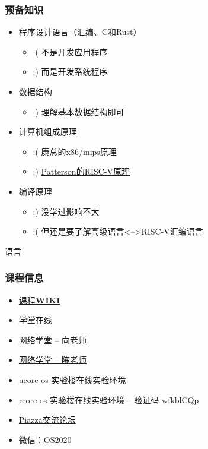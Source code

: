 \begin{frame}

\frametitle{预备知识}

\begin{itemize}

\item 程序设计语言（汇编、C和Rust）
  \begin{itemize}
    \item :( 不是开发应用程序
    \item :) 而是开发系统程序
  \end{itemize}
\item 数据结构
  \begin{itemize}
    \item :) 理解基本数据结构即可 
  \end{itemize}
\item 计算机组成原理
  \begin{itemize}
    \item :( 康总的x86/mips原理 
    \item  :)  \href{http://crva.ict.ac.cn/documents/RISC-V-Reader-Chinese-v2p1.pdf}{Patterson的RISC-V原理}
  \end{itemize}
\item 编译原理
  \begin{itemize}
    \item :) 没学过影响不大  
    \item :( 但还是要了解高级语言<-->RISC-V汇编语言

  \end{itemize}

\end{itemize}

\end{frame}

\begin{frame}语言
	\frametitle{课程信息}
	\begin{itemize}
		\item \href{http://os.cs.tsinghua.edu.cn/oscourse/OS2018spring}{课程\textbf{WIKI}}
		\item \href{http://www.xuetangx.com/courses/course-v1:TsinghuaX+30240243X_2015_T2+2015_T2/about}{学堂在线}
		\item \href{http://learn.tsinghua.edu.cn/f/wlxt/index/course/teacher/course?wlkcid=2019-2020-2140259621}{网络学堂 -- 向老师}		
		\item \href{http://learn.tsinghua.edu.cn/f/wlxt/index/course/teacher/course?wlkcid=2019-2020-2140259622}{网络学堂 -- 陈老师}
		\item \href{https://www.shiyanlou.com/courses/221}{ucore os-实验楼在线实验环境}
		\item \href{https://www.shiyanlou.com/courses/1481}{rcore os-实验楼在线实验环境 -- 验证码 wfkblCQp}
		\item \href{https://piazza.com/tsinghua.edu.cn/spring2015/30240243x/home}{Piazza交流论坛}
		\item 微信：OS2020
	\end{itemize}
\end{frame}



